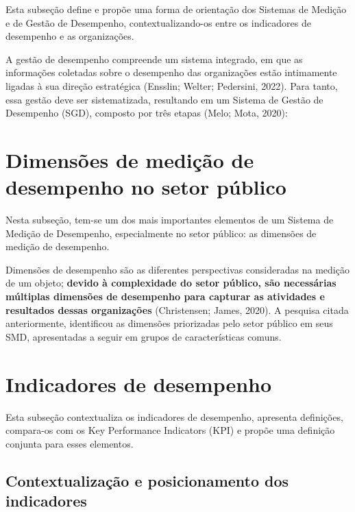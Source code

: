 \documentclass[
  letterpaper,
  DIV=11,
  numbers=noendperiod]{scrreprt}
\begin{document}
{Esta subseção define e propõe uma forma de orientação dos Sistemas de
Medição e de Gestão de Desempenho, contextualizando-os entre os
indicadores de desempenho e as organizações.}

A gestão de desempenho compreende um sistema integrado, em que as
informações coletadas sobre o desempenho das organizações estão
intimamente ligadas à sua direção estratégica (Ensslin; Welter;
Pedersini, 2022). Para tanto, essa gestão deve ser sistematizada,
resultando em um Sistema de Gestão de Desempenho (SGD), composto por
três etapas (Melo; Mota, 2020):

\hypertarget{dimensuxf5es-de-mediuxe7uxe3o-de-desempenho-no-setor-puxfablico}{%
\chapter{Dimensões de medição de desempenho no setor
público}\label{dimensuxf5es-de-mediuxe7uxe3o-de-desempenho-no-setor-puxfablico}}

{Nesta subseção, tem-se um dos mais importantes elementos de um Sistema
de Medição de Desempenho, especialmente no setor público: as dimensões
de medição de desempenho.}

Dimensões de desempenho são as diferentes perspectivas consideradas na
medição de um objeto; \textbf{devido à complexidade do setor público,
são necessárias múltiplas dimensões de desempenho para capturar as
atividades e resultados dessas organizações} (Christensen; James, 2020).
A pesquisa citada anteriormente, identificou as dimensões priorizadas
pelo setor público em seus SMD, apresentadas a seguir em grupos de
características comuns.

\hypertarget{indicadores-de-desempenho}{%
\chapter{Indicadores de desempenho}\label{indicadores-de-desempenho}}

{Esta subseção contextualiza os indicadores de desempenho, apresenta
definições, compara-os com os Key Performance Indicators (KPI) e propõe
uma definição conjunta para esses elementos.}

\hypertarget{contextualizauxe7uxe3o-e-posicionamento-dos-indicadores}{%
\section{Contextualização e posicionamento dos
indicadores}\label{contextualizauxe7uxe3o-e-posicionamento-dos-indicadores}}
\end{document}

